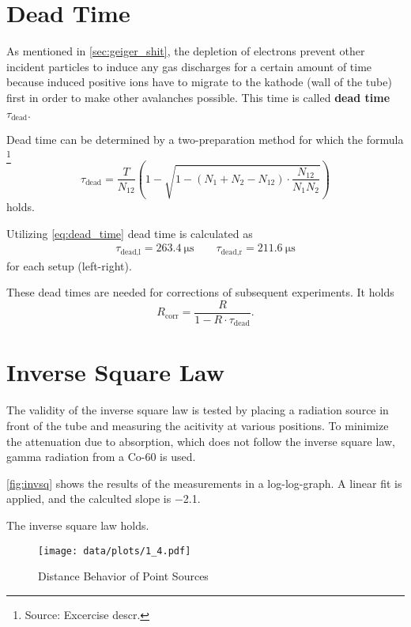 \section{Dead Time}
As mentioned in \autoref{sec:geiger_shit}, the depletion of electrons prevent other incident particles to induce any gas discharges for a certain amount of time because induced positive ions have to migrate to the kathode (wall of the tube) first in order to make other avalanches possible.
This time is called \textbf{dead time} $\tau_\text{dead}$.

Dead time can be determined by a two-preparation method for which the formula \footnote{Source: Excercise descr.}
\begin{equation}\label{eq:dead_time}
	\tau_\text{dead} = \frac{T}{N_{12}}\left(1-\sqrt{1-\left(N_1+N_2-N_{12}\right)\cdot\frac{N_{12}}{N_1N_2}}\right)
\end{equation}
holds.

Utilizing \autoref{eq:dead_time} dead time is calculated as
\begin{gather*}
 	\tau_\text{dead,l}=\SI{263.4}{\micro\second}\qquad \tau_\text{dead,r}=\SI{211.6}{\micro\second}
\end{gather*}
for each setup (left-right).

These dead times are needed for corrections of subsequent experiments.
It holds
\begin{equation}\label{eq:dead_time_corr}
	R_\text{corr}=\frac{R}{1-R\cdot\tau_\text{dead}}.
\end{equation}

\section{Inverse Square Law}
The validity of the inverse square law is tested by placing a radiation source in front of the tube and measuring the acitivity at various positions.
To minimize the attenuation due to absorption, which does not follow the inverse square law, gamma radiation from a Co-60 is used.

\autoref{fig:invsq} shows the results of the measurements in a log-log-graph.
A linear fit is applied, and the calculted slope is \num{-2.1}.

The inverse square law holds.

\begin{figure}[tb]
	\centering
	\texttt{[image: data/plots/1\_4.pdf]}
	\caption{Distance Behavior of Point Sources}
	\label{fig:invsq}
\end{figure}
